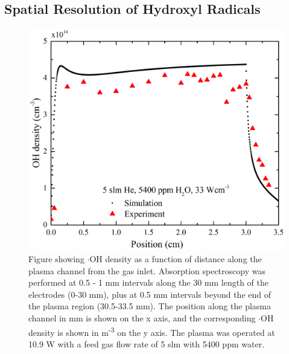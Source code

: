 \documentclass[11pt, oneside]{article}   	%
\begin{document}
\subsection{Spatial Resolution of Hydroxyl Radicals} \label{subsec:SpatialRes}

\begin{figure}
    \centering
    \includegraphics[width=\textwidth]{Figures/OHSpatialwithSimReal}
    \caption{Figure showing $\cdot$OH density as a function of distance along the plasma channel from the gas inlet. Absorption spectroscopy was performed at 0.5 - 1 mm intervals along the 30 mm length of the electrodes (0-30 mm), plus at 0.5 mm intervals beyond the end of the plasma region (30.5-33.5 mm). The position along the plasma channel in mm is shown on the x axis, and the corresponding $\cdot$OH density is shown in m\textsuperscript{-3} on the y axis. The plasma was operated at 10.9 W with a feed gas flow rate of 5 slm with 5400 ppm water.}
    \label{fig:SpatialRes}
\end{figure}
\end{document}
